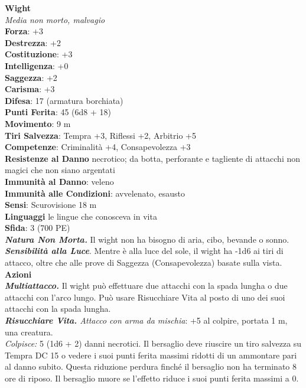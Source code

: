 \begin{multicols}{2}
\medskip\textbf{Wight}\\
\emph{Media non morto, malvagio}\\
\textbf{Forza}: +3\\
\textbf{Destrezza}: +2\\
\textbf{Costituzione}: +3\\
\textbf{Intelligenza}: +0\\
\textbf{Saggezza}: +2\\
\textbf{Carisma}: +3\\
\textbf{Difesa}: 17 (armatura borchiata)\\
\textbf{Punti Ferita}: 45 (6d8 + 18)\\
\textbf{Movimento}: 9 m\\
\textbf{Tiri Salvezza}: Tempra +3, Riflessi +2, Arbitrio +5\\
\textbf{Competenze}: Criminalità +4, Consapevolezza +3\\
\textbf{Resistenze al Danno} necrotico; da botta, perforante e tagliente di attacchi non magici che non siano argentati \\
\textbf{Immunità al Danno}: veleno\\
\textbf{Immunità alle Condizioni}: avvelenato, esausto\\
\textbf{Sensi}: Scurovisione 18 m\\
\textbf{Linguaggi} le lingue che conosceva in vita\\
\textbf{Sfida}: 3 (700 PE)\smallskip\\
\emph{\textbf{Natura Non Morta.}} Il wight non ha bisogno di aria, cibo, bevande o sonno.\\
\emph{\textbf{Sensibilità alla Luce}}. Mentre è alla luce del sole, il wight ha -1d6 ai tiri di attacco, oltre che alle prove di Saggezza (Consapevolezza) basate sulla vista.\\
\smallskip\textbf{Azioni}\\
\emph{\textbf{Multiattacco.}} Il wight può effettuare due attacchi con la spada lungha o due attacchi con l'arco lungo. Può usare Risucchiare Vita al posto di uno dei suoi attacchi con la spada lungha.\\
\emph{\textbf{Risucchiare Vita.} Attacco con arma da mischia}: +5 al colpire, portata 1 m, una creatura.\\
\emph{Colpisce:} 5 (1d6 + 2) danni necrotici. Il bersaglio deve riuscire un tiro salvezza su Tempra DC  15 o vedere i suoi punti ferita massimi ridotti di un ammontare pari al danno subito. Questa riduzione perdura finché il bersaglio non ha terminato 8 ore di riposo. Il bersaglio muore se l'effetto riduce i suoi punti ferita massimi a 0.\\


\end{multicols}
